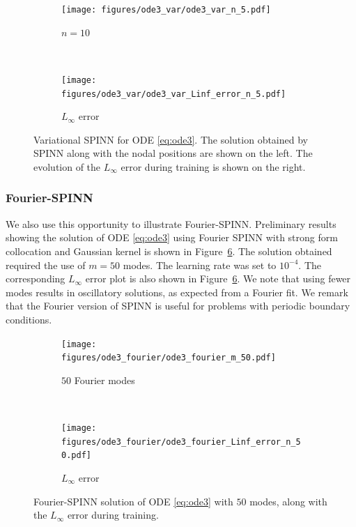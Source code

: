 \documentclass[12pt]{article}
\newcommand{\rr}[1]{#1}
\newcommand{\rb}[1]{#1}
\newcommand{\new}[1]{#1}
\begin{document}
\begin{figure}
\begin{subfigure}{0.5\textwidth}
\texttt{[image: figures/ode3\_var/ode3\_var\_n\_5.pdf]}
\caption{$n=10$}
\label{var_spinn_ode3}
\end{subfigure}
~
\begin{subfigure}{0.5\textwidth}
\texttt{[image: figures/ode3\_var/ode3\_var\_Linf\_error\_n\_5.pdf]}
\caption{$L_{\infty}$ error}
\label{var_spinn_ode3_error}
\end{subfigure}
\caption{Variational SPINN for ODE \eqref{eq:ode3}. The solution obtained by SPINN along with the nodal positions are shown on the left. The evolution of the $L_\infty$ error during training is shown on the right.}
\label{fig:var_spinn_ode3}
\end{figure}

\subsubsection{Fourier-SPINN}
\new{We also use this opportunity to illustrate Fourier-SPINN. Preliminary results showing the solution of ODE \eqref{eq:ode3} using Fourier SPINN with strong form collocation and Gaussian kernel is shown in Figure~\ref{fig:fourier_spinn_ode3}.} \rb{The solution obtained required the use of $m=50$ modes. The learning rate was set to $10^{-4}$.} \rr{The corresponding $L_\infty$ error plot is also shown in Figure~\ref{fig:fourier_spinn_ode3}.} \new{We note that using fewer modes results in oscillatory solutions, as expected from a Fourier fit. We remark that the Fourier version of SPINN is useful for problems with periodic boundary conditions.}

\begin{figure}
\begin{subfigure}{0.5\textwidth}
\texttt{[image: figures/ode3\_fourier/ode3\_fourier\_m\_50.pdf]}
\caption{$50$ Fourier modes}
\label{fig:fourier_spinn_ode3_m50}
\end{subfigure}
~
\begin{subfigure}{0.5\textwidth}
\texttt{[image: figures/ode3\_fourier/ode3\_fourier\_Linf\_error\_n\_50.pdf]}
\caption{$L_\infty$ error}
\label{fig:fourier_spinn_ode3_error}
\end{subfigure}
\caption{Fourier-SPINN solution of ODE \eqref{eq:ode3} with $50$ modes, along with the $L_\infty$ error during training.}
\label{fig:fourier_spinn_ode3}
\end{figure}
\end{document}

